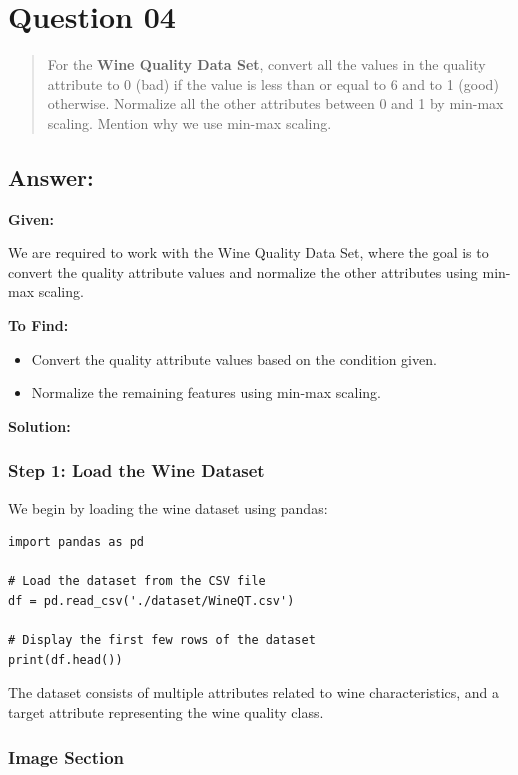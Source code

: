 \documentclass{exam}
\begin{document}
\section{Question 04}

\begin{quote}
For the \textbf{Wine Quality Data Set}, convert all the values in the quality attribute to 0 (bad) if the value is less than or equal to 6 and to 1 (good) otherwise. Normalize all the other attributes between 0 and 1 by min-max scaling. Mention why we use min-max scaling.
\end{quote}

\subsection{Answer:}

\textbf{Given:}

We are required to work with the Wine Quality Data Set, where the goal is to convert the quality attribute values and normalize the other attributes using min-max scaling.

\textbf{To Find:} 
\begin{itemize}
    \item Convert the quality attribute values based on the condition given.
    \item Normalize the remaining features using min-max scaling.
\end{itemize}

\textbf{Solution:}

\subsubsection{Step 1: Load the Wine Dataset}

We begin by loading the wine dataset using pandas:

\begin{verbatim}
import pandas as pd

# Load the dataset from the CSV file
df = pd.read_csv('./dataset/WineQT.csv')

# Display the first few rows of the dataset
print(df.head())
\end{verbatim}

The dataset consists of multiple attributes related to wine characteristics, and a target attribute representing the wine quality class.

\subsubsection*{Image Section}
\end{document}
